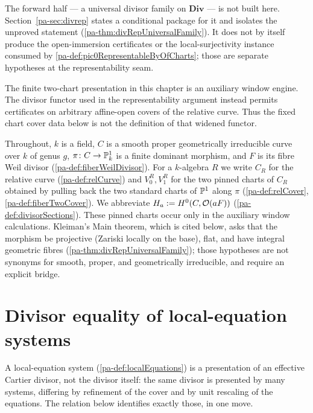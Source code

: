 The forward half --- a universal divisor family on \(\mathbf{Div}\) --- is not built here.
Section~\ref{pa-sec:divrep} states a conditional package for it and isolates the unproved
statement (\ref{pa-thm:divRepUniversalFamily}).  It does not by itself produce the
open-immersion certificates or the local-surjectivity instance consumed by
\ref{pa-def:pic0RepresentableByOfCharts}; those are separate hypotheses at the representability
seam.

The finite two-chart presentation in this chapter is an auxiliary window engine.  The divisor
functor used in the representability argument instead permits certificates on arbitrary
affine-open covers of the relative curve.  Thus the fixed chart cover data below is not the
definition of that widened functor.

Throughout, \(k\) is a field, \(C\) is a smooth proper geometrically irreducible curve over
\(k\) of genus \(g\), \(\pi \colon C \to \mathbb{P}^1_k\) is a finite dominant morphism, and
\(F\) is its fibre Weil divisor (\ref{pa-def:fiberWeilDivisor}). For a \(k\)-algebra \(R\) we
write \(C_R\) for the relative curve (\ref{pa-def:relCurve}) and \(V_0^R, V_1^R\) for the two
pinned charts of \(C_R\) obtained by pulling back the two standard charts of \(\mathbb{P}^1\)
along \(\pi\) (\ref{pa-def:relCover}, \ref{pa-def:fiberTwoCover}). We abbreviate
\(H_a := H^0(C, \mathcal{O}(aF))\) (\ref{pa-def:divisorSections}).  These pinned charts occur only
in the auxiliary window calculations.  Kleiman's Main theorem, which is cited below, asks
that the morphism be projective (Zariski locally on the base), flat, and have integral
geometric fibres (\ref{pa-thm:divRepUniversalFamily}); those hypotheses are not synonyms for
smooth, proper, and geometrically irreducible, and require an explicit bridge.

\section{Divisor equality of local-equation systems}
\label{pa-sec:diveq}

A local-equation system (\ref{pa-def:localEquations}) is a presentation of an effective
Cartier divisor, not the divisor itself: the same divisor is presented by many systems,
differing by refinement of the cover and by unit rescaling of the equations. The relation
below identifies exactly those, in one move.

